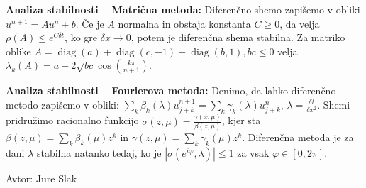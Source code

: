 \documentclass[a4paper,12pt]{article}
\theoremstyle{definition}
\renewcommand{\phi}{\varphi}
\newcommand{\dx}{\delta x}
\newcommand{\dt}{\delta t}
\newcommand{\diag}{\operatorname{diag}}
\begin{document}
\textbf{Analiza stabilnosti -- Matrična metoda:}
Diferenčno shemo zapišemo v obliki $u^{n+1} = Au^n + b$.
Če je $A$ normalna in obstaja konstanta $C \geq 0$, da velja
$\rho(A) \leq e^{C\dt}$, ko gre $\dx \to 0$, potem je diferenčna shema stabilna.
Za matriko oblike $A = \diag(a) + \diag(c, -1) + \diag(b, 1), bc \leq 0$ velja
$\lambda_k(A) = a + 2\sqrt{bc}\cos\left(\frac{k\pi}{n+1}\right)$.

\textbf{Analiza stabilnosti -- Fourierova metoda:}
Denimo, da lahko diferenčno metodo zapišemo v obliki:
$\sum_{k}\beta_k(\lambda)u_{j+k}^{n+1} = \sum_{k}\gamma_k(\lambda)u_{j+k}^n$,
$\lambda = \frac{\dt}{\dx^2}$. Shemi pridružimo racionalno funkcijo
$\sigma(z, \mu) = \frac{\gamma(x, \mu)}{\beta(z, \mu)}$, kjer sta $\beta(z, \mu) = \sum_k \beta_k(\mu)z^k$ in $\gamma(z, \mu) = \sum_k \gamma_k(\mu) z^k$.
Diferenčna metoda je za dani $\lambda$ stabilna natanko tedaj, ko je
$\left|\sigma(e^{i\phi}, \lambda)\right| \leq 1$ za vsak $\phi \in [0, 2\pi]$.

\hfill Avtor: Jure Slak
\end{document}
